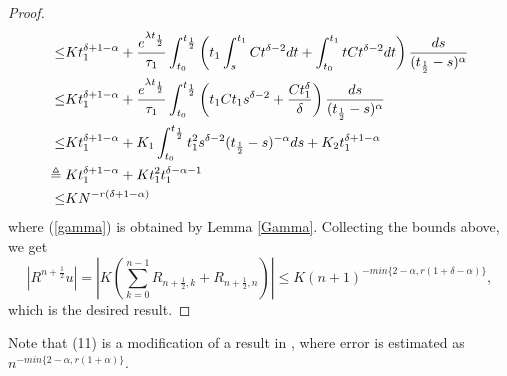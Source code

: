 \documentclass[10pt, reqno]{amsart}
\theoremstyle{remark}
\theoremstyle{definition}
\numberwithin{table}{section}
\begin{document}
\begin{proof}
\begin{align}
\leq &Kt_1^{\delta+1-\alpha}+\frac{e^{\lambda t_\frac{1}{2}}}{\tau_1}\int_{t_0}^{t_{\frac{1}{2}}}\left(t_1\int_s^{t_{1}}Ct^{\delta-2}dt+\int_{t_0}^{t_{1}}tCt^{\delta-2}dt\right)\frac{ds}{(t_{\frac{1}{2}}-s)^\alpha}\notag\\
\leq&Kt_1^{\delta+1-\alpha}+\frac{e^{\lambda t_\frac{1}{2}}}{\tau_1}\int_{t_0}^{t_{\frac{1}{2}}}\left(t_1Ct_1s^{\delta-2}+\frac{Ct_1^\delta}{\delta}\right)\frac{ds}{(t_{\frac{1}{2}}-s)^\alpha}\notag\\
\leq &Kt_1^{\delta+1-\alpha}+K_1\int_{t_0}^{t_{\frac{1}{2}}}t_1^2s^{\delta-2}(t_{\frac{1}{2}}-s)^{-\alpha}ds+K_2t_1^{\delta+1-\alpha}\notag\\
\triangleq{}&Kt_1^{\delta+1-\alpha}+Kt_1^2 t_1^{\delta-\alpha-1}\label{gamma}\\
\leq &KN^{-r(\delta+1-\alpha)}
\end{align}
where (\ref{gamma}) is obtained by Lemma \ref{Gamma}. 
Collecting the bounds above, we get 
\begin{equation}
        |R^{n+\frac{1}{2}}u| =|K(\sum_{k=0}^{n-1}R_{{n+\frac{1}{2}}, k}+R_{{n+\frac{1}{2}}, n})|\leq K(n+1)^{-min\{2-\alpha, r(1+\delta-\alpha)\}}, 
\end{equation}
which is the desired result. 
\end{proof}
Note that (11) is a modification of a result in \cite{cao2023},  where error is estimated as $n^{-min\{2-\alpha, r(1+\alpha)\}}$. 
\end{document}
